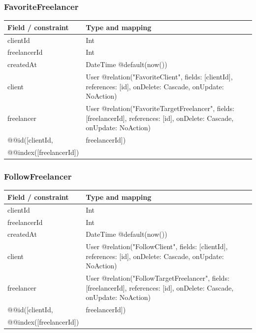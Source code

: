 \subsubsection{FavoriteFreelancer}
\begin{longtable}{|L{3.3cm}|L{10.8cm}|}\hline
Field / constraint & Type and mapping \\ \hline
clientId & Int \\ \hline
freelancerId & Int \\ \hline
createdAt & DateTime @default(now()) \\ \hline
client & User @relation("FavoriteClient", fields: [clientId], references: [id], onDelete: Cascade, onUpdate: NoAction) \\ \hline
freelancer & User @relation("FavoriteTargetFreelancer", fields: [freelancerId], references: [id], onDelete: Cascade, onUpdate: NoAction) \\ \hline
@@id([clientId, & freelancerId]) \\ \hline
@@index([freelancerId]) &  \\ \hline
\end{longtable}
\subsubsection{FollowFreelancer}
\begin{longtable}{|L{3.3cm}|L{10.8cm}|}\hline
Field / constraint & Type and mapping \\ \hline
clientId & Int \\ \hline
freelancerId & Int \\ \hline
createdAt & DateTime @default(now()) \\ \hline
client & User @relation("FollowClient", fields: [clientId], references: [id], onDelete: Cascade, onUpdate: NoAction) \\ \hline
freelancer & User @relation("FollowTargetFreelancer", fields: [freelancerId], references: [id], onDelete: Cascade, onUpdate: NoAction) \\ \hline
@@id([clientId, & freelancerId]) \\ \hline
@@index([freelancerId]) &  \\ \hline
\end{longtable}
